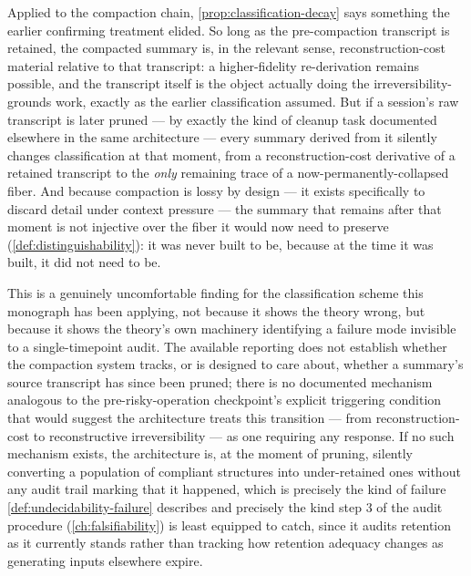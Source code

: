 \documentclass[11pt]{book}
\theoremstyle{plain}
\theoremstyle{definition}
\theoremstyle{remark}
\begin{document}
Applied to the compaction chain, \cref{prop:classification-decay} says
something the earlier confirming treatment elided. So long as the
pre-compaction transcript is retained, the compacted summary is, in
the relevant sense, reconstruction-cost material relative to that
transcript: a higher-fidelity re-derivation remains possible, and the
transcript itself is the object actually doing the irreversibility-
grounds work, exactly as the earlier classification assumed. But if a
session's raw transcript is later pruned --- by exactly the kind of
cleanup task documented elsewhere in the same architecture --- every
summary derived from it silently changes classification at that
moment, from a reconstruction-cost derivative of a retained transcript
to the \emph{only} remaining trace of a now-permanently-collapsed
fiber. And because compaction is lossy by design --- it exists
specifically to discard detail under context pressure --- the summary
that remains after that moment is not injective over the fiber it
would now need to preserve (\cref{def:distinguishability}): it was
never built to be, because at the time it was built, it did not need
to be.

This is a genuinely uncomfortable finding for the classification
scheme this monograph has been applying, not because it shows the
theory wrong, but because it shows the theory's own machinery
identifying a failure mode invisible to a single-timepoint audit. The
available reporting does not establish whether the compaction system
tracks, or is designed to care about, whether a summary's source
transcript has since been pruned; there is no documented mechanism
analogous to the pre-risky-operation checkpoint's explicit triggering
condition that would suggest the architecture treats this transition
--- from reconstruction-cost to reconstructive irreversibility --- as
one requiring any response. If no such mechanism exists, the
architecture is, at the moment of pruning, silently converting a
population of compliant structures into under-retained ones without
any audit trail marking that it happened, which is precisely the kind
of failure \cref{def:undecidability-failure} describes and precisely
the kind step 3 of the audit procedure (\cref{ch:falsifiability}) is
least equipped to catch, since it audits retention as it currently
stands rather than tracking how retention adequacy changes as
generating inputs elsewhere expire.
\end{document}

